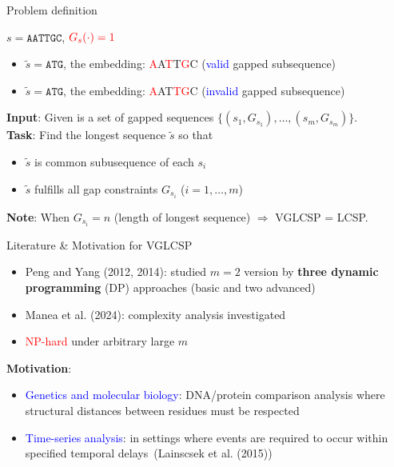 \documentclass{beamer}
\begin{document}
\begin{frame}{Problem definition}

   \begin{example}
      $s=\texttt{AATTGC}$, $\textcolor{red}{G_s(\cdot)=1}$
      \begin{itemize}
         \item  $\tilde{s}=\texttt{ATG}$, the embedding: \textcolor{red}{A}A\textcolor{red}{T}T\textcolor{red}{G}C (\textcolor{blue}{valid} gapped subsequence)
         \item  $\tilde{s}=\texttt{ATG}$, the embedding: \textcolor{red}{A}A{T}\textcolor{red}{T}\textcolor{red}{G}C (\textcolor{blue}{invalid} gapped subsequence)
      \end{itemize}
   \end{example} \vspace{0.3cm}
    
   \begin{definition}
        \textbf{Input}: Given is a set of gapped sequences $\{ (s_1, G_{s_1}), \ldots, (s_m, G_{s_m}) \}$. \\
        \textbf{Task}: Find the longest  sequence $\tilde{s}$ so that 
        \begin{itemize}
            \item  $\tilde{s}$ is common subusequence of each $s_i$
            \item $\tilde{s}$ fulfills all gap constraints $G_{s_i}$ ($i=1, \ldots, m$)
        \end{itemize}
    \end{definition}
    \textbf{Note}: When $G_{s_i}=n$ (length of longest sequence) $\Rightarrow$ VGLCSP = LCSP.
\end{frame}

\begin{frame}{Literature \& Motivation for VGLCSP}
   
   \begin{itemize}
       \item  Peng and Yang (2012, 2014): studied  $m=2$  version by \textbf{three dynamic programming} (DP) approaches (basic and two advanced)
       \item  Manea et al. (2024): complexity analysis investigated
       \item \textcolor{red}{NP-hard} under arbitrary large $m$ 
   \end{itemize} \vspace{0.7cm}
   
   \textbf{Motivation}:
   \begin{itemize}
       \item  \textcolor{blue}{Genetics and molecular biology}: DNA/protein comparison analysis where structural distances between residues must be respected \vspace{0.2cm}
       \item \textcolor{blue}{Time-series analysis}: in settings where events are required to occur within specified temporal delays~(Lainscsek et al. (2015))
   \end{itemize}
   
\end{frame}
\end{document}
